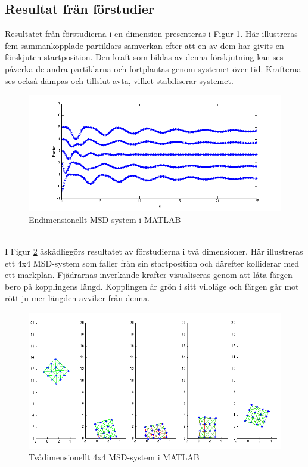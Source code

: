 \documentclass[a4paper,12pt,oneside,final,swedish]{extarticle}
\begin{document}
\subsection{Resultat från förstudier}
Resultatet från förstudierna i en dimension presenteras i Figur \ref{endim::nonfloat}. Här illustreras fem sammankopplade partiklars samverkan efter att en av dem har givits en förskjuten startposition. Den kraft som bildas av denna förskjutning kan ses påverka de andra partiklarna och fortplantas genom systemet över tid. Krafterna ses också dämpas och tillslut avta, vilket stabiliserar systemet.

\begin{figure}[h!]
  \begin{center}
    \includegraphics[width=13cm]{Bilder/1D_matlab.png} 
  \end{center}
  \caption{Endimensionellt MSD-system i MATLAB}
  \label{endim::nonfloat}
\end{figure}

\noindent \\I Figur \ref{tvådim::nonfloat} åskådliggörs resultatet av förstudierna i två dimensioner. Här illustreras ett 4x4 MSD-system som faller från sin startposition och därefter kolliderar med ett markplan.
Fjädrarnas inverkande krafter visualiseras genom att låta färgen bero på kopplingens längd. 
Kopplingen är grön i sitt viloläge och färgen går mot rött ju mer längden avviker från denna.

\begin{figure}[h!]
  \begin{center}
    \includegraphics[width=13cm]{Bilder/boing.png} 
  \end{center}
  \caption{Tvådimensionellt 4x4 MSD-system i MATLAB}
  \label{tvådim::nonfloat}
\end{figure}
\end{document}
